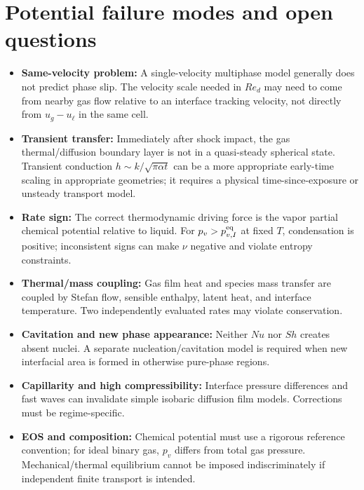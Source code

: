 \documentclass[11pt,letterpaper]{article}
\begin{document}
\section{Potential failure modes and open questions}
\begin{itemize}
\item \textbf{Same-velocity problem:} A single-velocity multiphase model generally does not predict phase slip. The velocity scale needed in $Re_d$ may need to come from nearby gas flow relative to an interface tracking velocity, not directly from $u_g-u_\ell$ in the same cell.
\item \textbf{Transient transfer:} Immediately after shock impact, the gas thermal/diffusion boundary layer is not in a quasi-steady spherical state. Transient conduction $h\sim k/\sqrt{\pi\alpha t}$ can be a more appropriate early-time scaling in appropriate geometries; it requires a physical time-since-exposure or unsteady transport model.
\item \textbf{Rate sign:} The correct thermodynamic driving force is the vapor partial chemical potential relative to liquid. For $p_v>p_{v,I}^{\rm eq}$ at fixed $T$, condensation is positive; inconsistent signs can make $\nu$ negative and violate entropy constraints.
\item \textbf{Thermal/mass coupling:} Gas film heat and species mass transfer are coupled by Stefan flow, sensible enthalpy, latent heat, and interface temperature. Two independently evaluated rates may violate conservation.
\item \textbf{Cavitation and new phase appearance:} Neither $Nu$ nor $Sh$ creates absent nuclei. A separate nucleation/cavitation model is required when new interfacial area is formed in otherwise pure-phase regions.
\item \textbf{Capillarity and high compressibility:} Interface pressure differences and fast waves can invalidate simple isobaric diffusion film models. Corrections must be regime-specific.
\item \textbf{EOS and composition:} Chemical potential must use a rigorous reference convention; for ideal binary gas, $p_v$ differs from total gas pressure. Mechanical/thermal equilibrium cannot be imposed indiscriminately if independent finite transport is intended.
\end{itemize}
\end{document}
